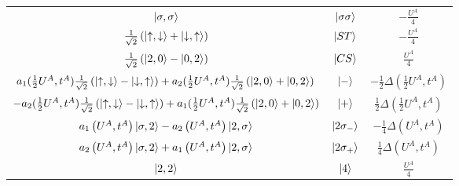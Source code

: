 \documentclass[12pt]{article}
\numberwithin{equation}{section}
\begin{document}
\begin{center}
\begin{tabular}{|c|c|c|}
	\(\ket{\sigma,\sigma}\) & \(\ket{\sigma\sigma}\) & \(-\frac{U^A}{4}\)\\
	\(\frac{1}{\sqrt 2}\left(\ket{\uparrow, \downarrow} + \ket{\downarrow, \uparrow}\right)\) & \(\ket{ST}\) & \(-\frac{U^A}{4}\)\\
	\(\frac{1}{\sqrt 2}\left(\ket{2, 0} - \ket{0, 2}\right)\) & \(\ket{CS}\) & \(\frac{U^A}{4}\)\\
	$a_1( \frac{1}{2}U^A, t^A) \frac{1}{\sqrt 2}\left(\ket{\uparrow,\downarrow} - \ket{\downarrow,\uparrow}\right) + a_2( \frac{1}{2}U^A, t^A)\frac{1}{\sqrt 2}\left(\ket{2,0} + \ket{0,2}\right)$ & $\ket{-}$ & \(-\frac{1}{2}\Delta( \frac{1}{2}U^A, t^A)\)\\
	$-a_2(\frac{1}{2}U^A, t^A) \frac{1}{\sqrt 2}\left(\ket{\uparrow,\downarrow} - \ket{\downarrow,\uparrow}\right) + a_1(\frac{1}{2}U^A, t^A)\frac{1}{\sqrt 2}\left(\ket{2,0} + \ket{0,2}\right)$ & $\ket{+}$ & \(\frac{1}{2}\Delta(\frac{1}{2}U^A, t^A)\)\\
	\(a_1\left(U^A, t^A\right)\ket{\sigma,2} - a_2\left(U^A, t^A\right)\ket{2, \sigma}\) & \(\ket{2\sigma_-}\) & \(-\frac{1}{4}\Delta(U^A, t^A)\)\\
	\(a_2\left(U^A, t^A\right)\ket{\sigma,2} + a_1\left(U^A, t^A\right)\ket{2, \sigma}\) & \(\ket{2\sigma_+}\) & \(\frac{1}{4}\Delta(U^A, t^A)\)\\
	\(\ket{2,2}\) & \(\ket{4}\) & \(\frac{U^A}{4}\)\\
	\hline
	\end{tabular}
\end{center}
\end{document}
